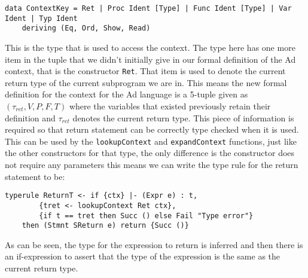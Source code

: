 \begin{lstlisting}[numbers=none]
data ContextKey = Ret | Proc Ident [Type] | Func Ident [Type] | Var Ident | Typ Ident
    deriving (Eq, Ord, Show, Read)
\end{lstlisting}
This is the type that is used to access the context.
The type here has one more item in the tuple that we didn't initially give in our formal definition of the Ad context, that is the constructor \texttt{Ret}.
That item is used to denote the current return type of the current subprogram we are in.
This means the new formal definition for the context for the Ad language is a 5-tuple given as $(\tau_{ret}, V, P, F, T)$ where the variables that existed previously retain their definition and $\tau_{ret}$ denotes the current return type.
This piece of information is required so that return statement can be correctly type checked when it is used.
This can be used by the \texttt{lookupContext} and \texttt{expandContext} functions, just like the other constructors for that type, the only difference is the constructor does not require any parameters this means we can write the type rule for the return statement to be:
\begin{lstlisting}
typerule ReturnT <- if {ctx} |- (Expr e) : t, 
        {tret <- lookupContext Ret ctx}, 
        {if t == tret then Succ () else Fail "Type error"} 
    then (Stmnt SReturn e) return {Succ ()} 
\end{lstlisting}
As can be seen, the type for the expression to return is inferred and then there is an if-expression to assert that the type of the expression is the same as the current return type.

